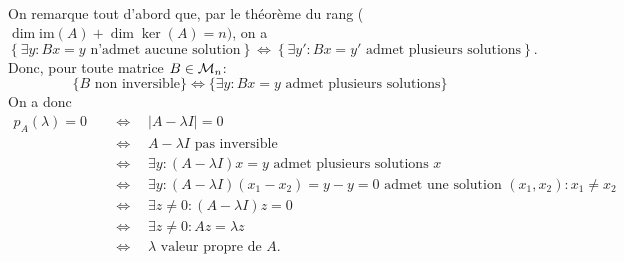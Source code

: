 \proof 
   \\
  On remarque tout d'abord que, par le théorème du rang ($\dim \text{im}(A) + \dim \ker(A) = n)$, 
  on a 
  $$
  \left\{\exists y: B x = y \text{ n'admet aucune solution}\right\} \Leftrightarrow \left\{\exists y': B x = y' \text{ admet plusieurs solutions}\right\}.
  $$
  Donc, pour toute matrice $B \in \mathcal{M}_n$:
  $$
  \{B \text{ non inversible}\} \Leftrightarrow \{\exists y: B x = y \text{ admet plusieurs solutions}\}
  $$
  On a donc
  \begin{align*}
    p_A(\lambda) = 0 
    & \quad \Leftrightarrow \quad |A - \lambda I| = 0 \\
    & \quad \Leftrightarrow \quad A - \lambda I \text{ pas inversible} \\
    & \quad \Leftrightarrow \quad \exists y: (A - \lambda I)x = y \text{ admet plusieurs solutions $x$} \\
    & \quad \Leftrightarrow \quad \exists y: (A - \lambda I)(x_1 - x_2) = y-y = 0 \text{ admet une solution $(x_1, x_2): x_1 \neq x_2$} \\
    & \quad \Leftrightarrow \quad \exists z \neq 0: (A - \lambda I)z = 0 \\
    & \quad \Leftrightarrow \quad \exists z \neq 0: A z = \lambda z \\
    & \quad \Leftrightarrow \quad \lambda \text{ valeur propre de } A. 
  \end{align*} 
\eproof

